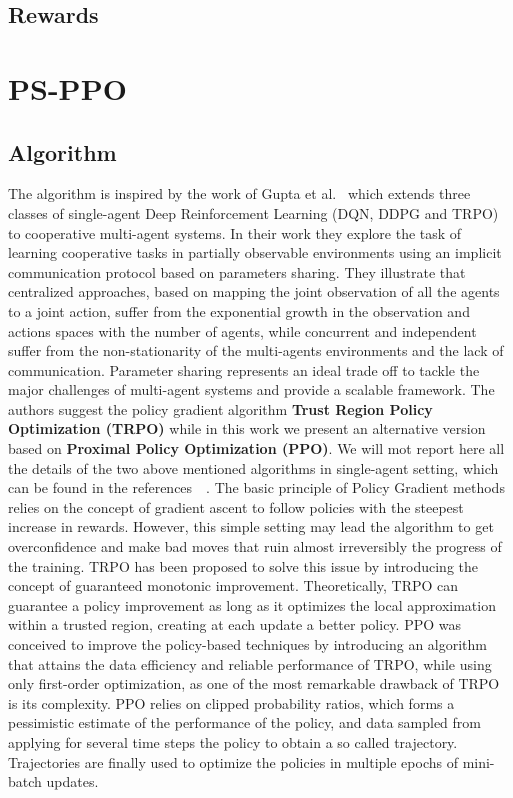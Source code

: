 \documentclass[11pt, a4paper, hidelinks]{report}
\begin{document}
\subsection{Rewards}\label{subsec:rewards2}


\section{PS-PPO}\label{sec:ps-ppo}
\subsection{Algorithm}\label{subsec:the-algorithm}
The algorithm is inspired by the work of Gupta et al.~\cite{ps-ppo_paper} which extends three classes of single-agent Deep Reinforcement Learning (DQN, DDPG and TRPO) to cooperative multi-agent systems.
In their work they explore the task of learning cooperative tasks in partially observable environments using an implicit communication protocol based on parameters sharing.
They illustrate that centralized approaches, based on mapping the joint observation of all the agents to a joint action, suffer from the exponential growth in the observation and actions spaces with the number of agents, while concurrent and independent suffer from the non-stationarity of the multi-agents environments and the lack of communication.
Parameter sharing represents an ideal trade off to tackle the major challenges of multi-agent systems and provide a scalable framework.
The authors suggest the policy gradient algorithm \textbf{Trust Region Policy Optimization (TRPO)} while in this work we present an alternative version based on \textbf{Proximal Policy Optimization (PPO)}.
We will mot report here all the details of the two above mentioned algorithms in single-agent setting, which can be found in the references~\cite{trpo}~\cite{ppo}.
The basic principle of Policy Gradient methods relies on the concept of gradient ascent to follow policies with the steepest increase in rewards.
However, this simple setting may lead the algorithm to get overconfidence and make bad moves that ruin almost irreversibly the progress of the training.
TRPO has been proposed to solve this issue by introducing the concept of guaranteed monotonic improvement.
Theoretically, TRPO can guarantee a policy improvement as long as it optimizes the local approximation within a trusted region, creating at each update a better policy.
PPO was conceived to improve the policy-based techniques by introducing an algorithm that attains the data efficiency and reliable performance of TRPO, while using only first-order optimization, as one of the most remarkable drawback of TRPO is its complexity.
PPO relies on clipped probability ratios, which forms a pessimistic estimate of the performance of the policy, and data sampled from applying for several time steps the policy to obtain a so called trajectory.
Trajectories are finally used to optimize the policies in multiple epochs of mini-batch updates.
\end{document}
